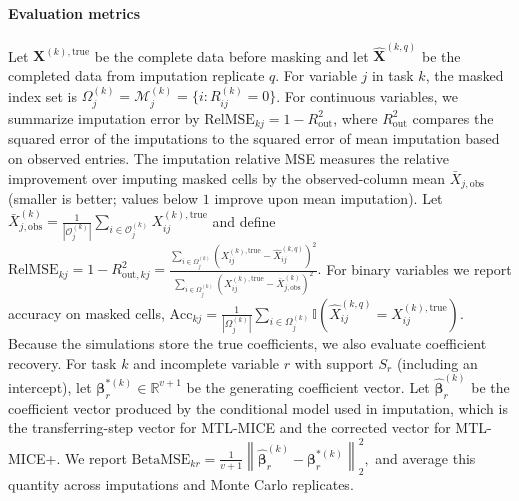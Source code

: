 \documentclass[12pt]{article}
\begin{document}
\paragraph{Evaluation metrics}
Let $\bm{X}^{(k),\mathrm{true}}$ be the complete data before masking and let $\widehat{\bm{X}}^{(k,q)}$ be the completed data from imputation replicate $q$. For variable $j$ in task $k$, the masked index set is $\Omega^{(k)}_j=\mathcal{M}^{(k)}_j=\{i:R^{(k)}_{ij}=0\}$. For continuous variables, we summarize imputation error by $\mathrm{RelMSE}_{kj} = 1-R^2_{\mathrm{out}}$, where $R^2_{\mathrm{out}}$ compares the squared error of the imputations to the squared error of mean imputation based on observed entries. The imputation relative MSE measures the relative improvement over imputing masked cells by the observed-column mean $\bar{X}_{j,\mathrm{obs}}$ (smaller is better; values below $1$ improve upon mean imputation).  Let $\bar{X}^{(k)}_{j,\mathrm{obs}}=\frac{1}{|\mathcal{O}^{(k)}_j|}\sum_{i\in\mathcal{O}^{(k)}_j}X^{(k),\mathrm{true}}_{ij}$ and define
\(\mathrm{RelMSE}_{kj} = 1-R^2_{\mathrm{out},kj}
=\frac{\sum_{i\in\Omega^{(k)}_j}\left(X^{(k),\mathrm{true}}_{ij}-\widehat{X}^{(k,q)}_{ij}\right)^2}
{\sum_{i\in\Omega^{(k)}_j}\left(X^{(k),\mathrm{true}}_{ij}-\bar{X}^{(k)}_{j,\mathrm{obs}}\right)^2}.\)
For binary variables we report accuracy on masked cells,
\(\mathrm{Acc}_{kj}=\frac{1}{|\Omega^{(k)}_j|}\sum_{i\in\Omega^{(k)}_j}
\mathbb{I}\!\left(\widehat{X}^{(k,q)}_{ij}=X^{(k),\mathrm{true}}_{ij}\right).\)
Because the simulations store the true coefficients, we also evaluate coefficient recovery. For task $k$ and incomplete variable $r$ with support $S_r$ (including an intercept), let $\bm{\beta}^{*(k)}_{r}\in\mathbb{R}^{v+1}$ be the generating coefficient vector. Let $\widehat{\bm{\beta}}^{(k)}_{r}$ be the coefficient vector produced by the conditional model used in imputation, which is the transferring-step vector for MTL-MICE and the corrected vector for MTL-MICE+. We report
\(\mathrm{BetaMSE}_{kr}=\frac{1}{v+1}\left\|\widehat{\bm{\beta}}^{(k)}_{r}-\bm{\beta}^{*(k)}_{r}\right\|_2^2,\)
and average this quantity across imputations and Monte Carlo replicates.
\end{document}
